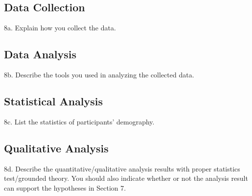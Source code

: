 \subsection{Data Collection}
    8a. Explain how you collect the data.
\subsection{Data Analysis}
    8b. Describe the tools you used in analyzing the collected data.
\subsection{Statistical Analysis}
    8c. List the statistics of participants' demography.
\subsection{Qualitative Analysis}
    8d. Describe the quantitative/qualitative analysis results with proper
    statistics test/grounded theory. You should also indicate whether or not the
    analysis result can support the hypotheses in Section 7.
